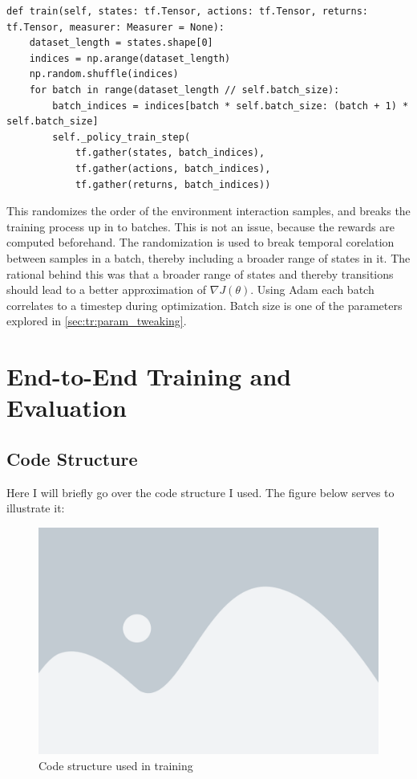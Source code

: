\begin{lstlisting}[basicstyle=\footnotesize]
def train(self, states: tf.Tensor, actions: tf.Tensor, returns: tf.Tensor, measurer: Measurer = None):
    dataset_length = states.shape[0]
    indices = np.arange(dataset_length)
    np.random.shuffle(indices)
    for batch in range(dataset_length // self.batch_size):
        batch_indices = indices[batch * self.batch_size: (batch + 1) * self.batch_size]
        self._policy_train_step(
            tf.gather(states, batch_indices),
            tf.gather(actions, batch_indices),
            tf.gather(returns, batch_indices))
\end{lstlisting}

\noindent
This randomizes the order of the environment interaction samples, and breaks the training process up in to batches. This is not an issue, because the rewards are computed beforehand. The randomization is used to break temporal corelation between samples in a batch, thereby including a broader range of states in it. The rational behind this was that a broader range of states and thereby transitions should lead to a better approximation of $\nabla J(\theta)$. Using Adam each batch correlates to a timestep during optimization. Batch size is one of the parameters explored in \ref{sec:tr:param_tweaking}.

\section{End-to-End Training and Evaluation}\label{sec:ip:training_testing}

\subsection{Code Structure}\label{subsec:ip:tt:class_structure}
Here I will briefly go over the code structure I used. The figure below serves to illustrate it:

\begin{figure}[H]
    \centering
    \includegraphics[width=0.7\linewidth]{figures/placeholder.png}
    \caption{Code structure used in training}
    \label{fig:code_structure}
\end{figure}

